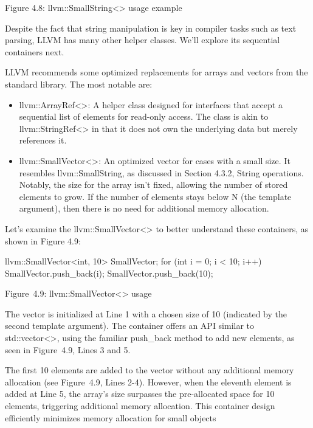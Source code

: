 \begin{center}
Figure 4.8: llvm::SmallString<> usage example
\end{center}

Despite the fact that string manipulation is key in compiler tasks such as text parsing, LLVM has many other helper classes. We’ll explore its sequential containers next.


LLVM recommends some optimized replacements for arrays and vectors from the standard library. The most notable are:

\begin{itemize}
\item
llvm::ArrayRef<>: A helper class designed for interfaces that accept a sequential list of elements for read-only access. The class is akin to llvm::StringRef<> in that it does not own the underlying data but merely references it.

\item
llvm::SmallVector<>: An optimized vector for cases with a small size. It resembles llvm::SmallString, as discussed in Section 4.3.2, String operations. Notably, the size for the array isn’t fixed, allowing the number of stored elements to grow. If the number of elements stays below N (the template argument), then there is no need for additional memory allocation.
\end{itemize}

Let’s examine the llvm::SmallVector<> to better understand these containers, as shown in Figure 4.9:

\begin{cpp}
llvm::SmallVector<int, 10> SmallVector;
for (int i = 0; i < 10; i++) {
  SmallVector.push_back(i);
}
SmallVector.push_back(10);
\end{cpp}

\begin{center}
Figure 4.9: llvm::SmallVector<> usage
\end{center}

The vector is initialized at Line 1 with a chosen size of 10 (indicated by the second template argument). The container offers an API similar to std::vector<>, using the familiar push\_back method to add new elements, as seen in Figure 4.9, Lines 3 and 5.

The first 10 elements are added to the vector without any additional memory allocation (see Figure 4.9, Lines 2-4). However, when the eleventh element is added at Line 5, the array’s size surpasses the pre-allocated space for 10 elements, triggering additional memory allocation. This container design efficiently minimizes memory allocation for small objects

